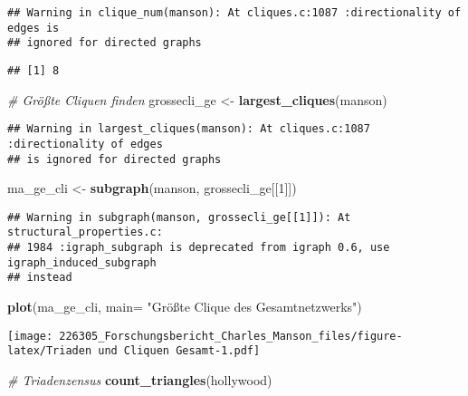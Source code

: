 \documentclass[
]{article}
\newenvironment{Shaded}{\begin{snugshade}}{\end{snugshade}}
\newcommand{\CommentTok}[1]{\textcolor[rgb]{0.56,0.35,0.01}{\textit{#1}}}
\newcommand{\DataTypeTok}[1]{\textcolor[rgb]{0.13,0.29,0.53}{#1}}
\newcommand{\DecValTok}[1]{\textcolor[rgb]{0.00,0.00,0.81}{#1}}
\newcommand{\KeywordTok}[1]{\textcolor[rgb]{0.13,0.29,0.53}{\textbf{#1}}}
\newcommand{\NormalTok}[1]{#1}
\newcommand{\StringTok}[1]{\textcolor[rgb]{0.31,0.60,0.02}{#1}}
\begin{document}
\begin{verbatim}
## Warning in clique_num(manson): At cliques.c:1087 :directionality of edges is
## ignored for directed graphs
\end{verbatim}

\begin{verbatim}
## [1] 8
\end{verbatim}

\begin{Shaded}
\begin{Highlighting}[]
\CommentTok{# Größte Cliquen finden}
\NormalTok{grossecli_ge <-}\StringTok{ }\KeywordTok{largest_cliques}\NormalTok{(manson)}
\end{Highlighting}
\end{Shaded}

\begin{verbatim}
## Warning in largest_cliques(manson): At cliques.c:1087 :directionality of edges
## is ignored for directed graphs
\end{verbatim}

\begin{Shaded}
\begin{Highlighting}[]
\NormalTok{ma_ge_cli <-}\StringTok{ }\KeywordTok{subgraph}\NormalTok{(manson, grossecli_ge[[}\DecValTok{1}\NormalTok{]])}
\end{Highlighting}
\end{Shaded}

\begin{verbatim}
## Warning in subgraph(manson, grossecli_ge[[1]]): At structural_properties.c:
## 1984 :igraph_subgraph is deprecated from igraph 0.6, use igraph_induced_subgraph
## instead
\end{verbatim}

\begin{Shaded}
\begin{Highlighting}[]
\KeywordTok{plot}\NormalTok{(ma_ge_cli,}
     \DataTypeTok{main=} \StringTok{"Größte Clique des Gesamtnetzwerks"}\NormalTok{)}
\end{Highlighting}
\end{Shaded}

\texttt{[image: 226305\_Forschungsbericht\_Charles\_Manson\_files/figure-latex/Triaden und Cliquen Gesamt-1.pdf]}

\begin{Shaded}
\begin{Highlighting}[]
\CommentTok{# Triadenzensus}
\KeywordTok{count_triangles}\NormalTok{(hollywood)}
\end{Highlighting}
\end{Shaded}
\end{document}
